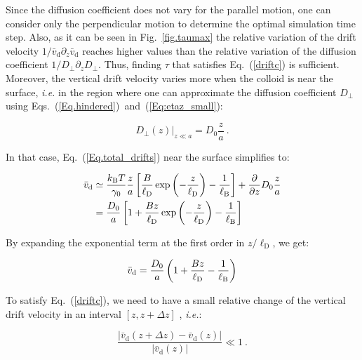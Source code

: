 Since the diffusion coefficient does not vary for the parallel motion, one can consider only the perpendicular motion to determine the optimal simulation time step. Also, as it can be seen in Fig.~\ref{fig.taumax} the relative variation of the drift velocity $1/\bar{v}_\mathrm{d} \partial_z \bar{v}_\mathrm{d}$ reaches higher values than the relative variation of the diffusion coefficient $1/D_\bot \partial_z D_\bot$. Thus, finding $\tau$ that satisfies Eq.~(\ref{driftc}) is sufficient. Moreover, the vertical drift velocity varies more when the colloid is near the surface, \textit{i.e.} in the region where one can approximate the diffusion coefficient $D_\bot$ using Eqs.~(\ref{Eq.hindered})~and~(\ref{Eq:etaz_small}):

\begin{equation}
	\left.D_\bot  (z)\right|_{z\ll a} = D_ 0 \frac{z}{a} ~.
	\label{Dsmall}
\end{equation}

In that case, Eq.~(\ref{Eq.total_drifts}) near the surface simplifies to:

\begin{equation}
	\begin{aligned}
		\bar{v}_\textnormal{d} &\simeq  \frac{k_\mathrm{B}T}{\gamma_0} \frac{z}{a} \left[\frac{B}{\ell_\mathrm{D}} \exp \left(-\frac{z}{\ell_\mathrm{D}}\right) - \frac{1}{\ell_{\mathrm{B}}}  \right] + \frac{\partial}{\partial z} D_0 \frac{z}{a} \\
		&= \frac{D_0}{a} \left[ 1 + \frac{Bz}{\ell_\mathrm{D}} \exp \left(-\frac{z}{\ell_\mathrm{D}}\right)- \frac{1}{\ell_{\mathrm{B}}}\right]
	\end{aligned}
\end{equation}

By expanding the exponential term at the first order in $z/\ell_\mathrm{D}$, we get:

\begin{equation}
	\begin{aligned}
		\bar{v}_\textnormal{d}  = \frac{D_0}{a} \left( 1 + \frac{B z}{\ell_\mathrm{D}} - \frac{1}{\ell_{\mathrm{B}}}\right)
	\end{aligned}
	\label{drifts_short}
\end{equation}

To satisfy Eq.~(\ref{driftc}), we need to have a small relative change of the vertical drift velocity in an interval $[z, z+\Delta z]$ \cite{matse_state-dependent_nodate}, \textit{i.e.}:

\begin{equation}
	\frac{|\bar{v}_\mathrm{d} (z + \Delta z) - \bar{v}_\mathrm{d} (z)|}{|\bar{v}_\mathrm{d} (z)|} \ll 1 ~.
	\label{condition_drift}
\end{equation}


